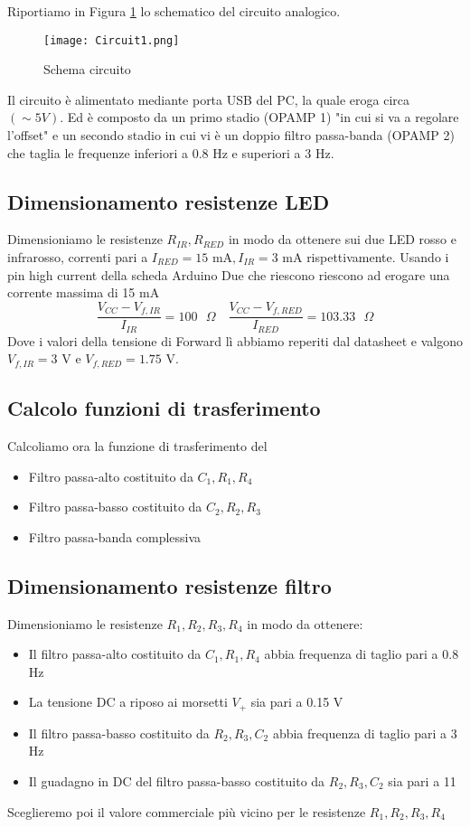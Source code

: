 Riportiamo in Figura \ref{fig:Circuit} lo schematico del circuito analogico.
\begin{figure}[H]
    \centering
    \texttt{[image: Circuit1.png]}
    \caption{Schema circuito }
    \label{fig:Circuit}
\end{figure}
Il circuito è alimentato mediante porta USB del PC, la quale eroga circa $(\sim 5 V)$. Ed è composto da un primo stadio (OPAMP 1) "in cui si va a regolare l'offset" e un secondo stadio in cui vi è un doppio filtro passa-banda (OPAMP 2) che taglia le frequenze inferiori a 0.8 Hz e superiori a 3 Hz.
\subsection{Dimensionamento resistenze LED}
Dimensioniamo le resistenze $R_{IR},R_{RED}$ in modo da ottenere sui due LED rosso e infrarosso, correnti pari a $I_{RED}=15\text{ mA},I_{IR}=$3 mA rispettivamente. Usando i pin high current della scheda Arduino Due che riescono riescono ad erogare una corrente massima di 15 mA
\begin{equation}
    \frac{V_{CC}-V_{f,IR}}{I_{IR}}=100\text{ }\Omega\quad\frac{V_{CC}-V_{f,RED}}{I_{RED}}=103.33\text{ }\Omega
\end{equation}
Dove i valori della tensione di Forward lì abbiamo reperiti dal datasheet e valgono $V_{f,IR}=3$ V e $V_{f,RED}=1.75$ V.
\subsection{Calcolo funzioni di trasferimento}
Calcoliamo ora la funzione di trasferimento del
\begin{itemize}
    \item Filtro passa-alto costituito da $C_1,R_1,R_4$
    \item Filtro passa-basso costituito da $C_2,R_2,R_3$
    \item Filtro passa-banda complessiva
\end{itemize}
\subsection{Dimensionamento resistenze filtro}
Dimensioniamo le resistenze $R_1, R_2, R_3, R_4$ in modo da ottenere:
\begin{itemize}
    \item Il filtro passa-alto costituito da $C_1, R_1, R_4$ abbia frequenza di taglio pari a 0.8 Hz
    \item La tensione DC a riposo ai morsetti $V_+$ sia pari a 0.15 V
    \item Il filtro passa-basso costituito da $R_2, R_3, C_2$ abbia frequenza di taglio pari a 3 Hz
    \item Il guadagno in DC del filtro passa-basso costituito da $R_2, R_3, C_2$ sia pari a 11   
\end{itemize}
Sceglieremo poi il valore commerciale più vicino per le resistenze $R_1, R_2, R_3, R_4$
